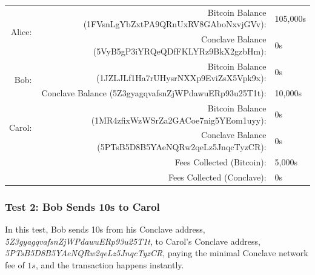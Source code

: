 \documentclass{report}
\begin{document}
			\begin{center}
			\bgroup
			\small
			\def\arraystretch{1.5}
			\begin{tabular}{|r|r|l|}
			\hline
			\multirow{2}{*}{Alice:}    & Bitcoin Balance (1FVsnLgYbZxtPA9QRnUxRV8GAboNxvjGVv):    & 105,000s \\ \cline{2-3} 
						               & Conclave Balance (5VyB5gP3iYRQeQDfFKLYRz9BkX2gzbHm):   & 0s \\ \hline
			\multirow{2}{*}{Bob:}      & Bitcoin Balance (1JZLJLf1Ha7rUHysrNXXp9EviZsX5Vpk9x):    & 0s \\ \cline{2-3} 
						               & Conclave Balance (5Z3gyagqvafsnZjWPdawuERp93u25T1t):   & 10,000s \\ \hline
			\multirow{2}{*}{Carol:}    & Bitcoin Balance (1MR4zfixWzWSrZa2GACoe7nig5YEom1uyy):    & 0s \\ \cline{2-3} 
						               & Conclave Balance (5PTsB5D8B5YAeNQRw2qeLz5JnqcTyzCR):   & 0s \\ \hline
			\multicolumn{2}{|r|}{Fees Collected (Bitcoin):}  & 5,000s \\ \hline
			\multicolumn{2}{|r|}{Fees Collected (Conclave):} & 0s \\ \hline
			\end{tabular}
			\egroup
			\bigbreak
			\normalsize
			\end{center}
			
			
			
			
			
			\subsubsection{Test 2: Bob Sends 10s to Carol}
			In this test, Bob sends 10s from his Conclave address, \textit{5Z3gyagqvafsnZjWPdawuERp93u25T1t}, to Carol's Conclave address, \textit{5PTsB5D8B5YAeNQRw2qeLz5JnqcTyzCR}, paying the minimal Conclave network fee of $1s$, and the transaction happens instantly.
			
			
			
\end{document}
